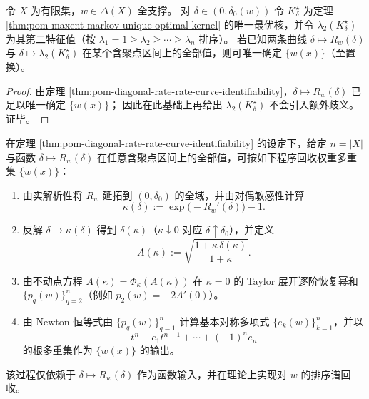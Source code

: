 \begin{corollary}\label{cor:pom-diagonal-rate-two-curve-identifiability}
令 \(X\) 为有限集，\(w\in\Delta(X)\) 全支撑。
对 \(\delta\in(0,\delta_0(w))\) 令 \(K^\star_\delta\) 为定理 \ref{thm:pom-maxent-markov-unique-optimal-kernel} 的唯一最优核，并令 \(\lambda_2(K^\star_\delta)\) 为其第二特征值（按 \(\lambda_1=1\ge \lambda_2\ge\cdots\ge \lambda_n\) 排序）。
若已知两条曲线
\(
\delta\mapsto R_w(\delta)
\)
与
\(
\delta\mapsto \lambda_2(K^\star_\delta)
\)
在某个含聚点区间上的全部值，则可唯一确定 \(\{w(x)\}\)（至置换）。
\end{corollary}
\begin{proof}
由定理 \ref{thm:pom-diagonal-rate-rate-curve-identifiability}，\(\delta\mapsto R_w(\delta)\) 已足以唯一确定 \(\{w(x)\}\)；
因此在此基础上再给出 \(\lambda_2(K^\star_\delta)\) 不会引入额外歧义。证毕。
\end{proof}

\begin{proposition}\label{prop:pom-diagonal-rate-reconstruct-w-from-rate-curve}
在定理 \ref{thm:pom-diagonal-rate-rate-curve-identifiability} 的设定下，给定 \(n=|X|\) 与函数 \(\delta\mapsto R_w(\delta)\) 在任意含聚点区间上的全部值，可按如下程序回收权重多重集 \(\{w(x)\}\)：
\begin{enumerate}
  \item 由实解析性将 \(R_w\) 延拓到 \((0,\delta_0)\) 的全域，并由对偶敏感性计算
  \[
  \kappa(\delta):=\exp\bigl(-R_w'(\delta)\bigr)-1.
  \]
  \item 反解 \(\delta\mapsto\kappa(\delta)\) 得到 \(\delta(\kappa)\)（\(\kappa\downarrow 0\) 对应 \(\delta\uparrow\delta_0\)），并定义
  \[
  A(\kappa):=\sqrt{\frac{1+\kappa\,\delta(\kappa)}{1+\kappa}}.
  \]
  \item 由不动点方程 \(A(\kappa)=\Phi_\kappa(A(\kappa))\) 在 \(\kappa=0\) 的 Taylor 展开逐阶恢复幂和 \(\{p_q(w)\}_{q=2}^{n}\)（例如 \(p_2(w)=-2A'(0)\)）。
  \item 由 Newton 恒等式由 \(\{p_q(w)\}_{q=1}^{n}\) 计算基本对称多项式 \(\{e_k(w)\}_{k=1}^{n}\)，并以
  \[
  t^n-e_1 t^{n-1}+\cdots+(-1)^n e_n
  \]
  的根多重集作为 \(\{w(x)\}\) 的输出。
\end{enumerate}
该过程仅依赖于 \(\delta\mapsto R_w(\delta)\) 作为函数输入，并在理论上实现对 \(w\) 的排序谱回收。
\end{proposition}
